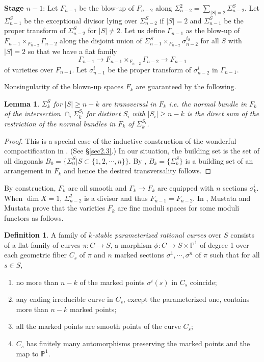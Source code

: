\documentclass[10pt]{amsart}
\newtheorem{lemma}[theorem]{Lemma}
\theoremstyle{definition}
\newtheorem{definition}[theorem]{Definition}
\newcommand{\PP}{\mathbb{P}}
\begin{document}
\bigskip
\noindent \textbf{Stage $n-1$}: Let $F_{n-1}$ be the blow-up of
$F_{n-2}$ along $\Sigma_{n-2}^2=\sum_{|S|=2}\Sigma_{n-2}^S$. Let
$\Sigma_{n-1}^S$ be the exceptional divisor lying over
$\Sigma_{n-2}^S$ if $|S|=2$ and $\Sigma_{n-1}^S$ be the proper
transform of $\Sigma_{n-2}^S$ for $|S|\ne 2$. Let us define
$\Gamma_{n-1}$ as the blow-up of
$F_{n-1}\times_{F_{n-2}}\Gamma_{n-2}$ along the disjoint union of
$\Sigma^S_{n-1}\times_{F_{n-2}}\sigma^{i_S}_{n-2}$ for all $S$
with $|S|=2$ so that we have a flat family
\[
\Gamma_{n-1}\to F_{n-1}\times_{F_{n-2}}\Gamma_{n-2} \to F_{n-1}
\]
of varieties over $F_{n-1}$. Let $\sigma_{n-1}^i$ be the proper
transform of $\sigma_{n-2}^i$ in $\Gamma_{n-1}$.

\bigskip
Nonsingularity of the blown-up spaces $F_k$ are guaranteed by the
following.

\begin{lemma}\label{lem3-1}
$\Sigma^S_{k}$ for $|S|\ge n-k$ are transversal in $F_{k}$ i.e.
the normal bundle in $F_{k}$ of  the intersection
$\cap_i\Sigma^{S_i}_k$ for distinct $S_i$ with $|S_i|\ge n-k$ is
the direct sum of  the restriction of the normal bundles in $F_k$
of $\Sigma^{S_i}_k$.
\end{lemma}
\begin{proof}
This is a special case of the inductive construction of the
wonderful compactification in \cite{Li}. (See \S \ref{sec2.3}.) In
our situation, the building set is the set of all diagonals $B_0 =
\{\Sigma_0^S | S \subset \{1, 2, \cdots, n\}\}$. By
\cite[Proposition 2.8]{Li}, $B_k=\{\Sigma_k^S\}$ is a building set
of an arrangement in $F_k$ and hence the desired transversality
follows.
\end{proof}



By construction, $F_k$ are all smooth and $\Gamma_k\to F_k$ are
equipped with $n$ sections $\sigma_k^i$. When $\dim X=1$,
$\Sigma^2_{n-2}$ is a divisor and thus $F_{n-1}=F_{n-2}$. In
\cite[Proposition 1.8]{Mustata}, Mustata and Mustata prove that
the varieties $F_k$ are fine moduli spaces for some moduli
functors as follows.

\begin{definition}\label{def3.1} \cite[Definition 1.7]{Mustata}
A family of \emph{$k$-stable parameterized rational curves} over
$S$ consists of a flat family of curves $\pi:C\to S$, a morphism
$\phi:C\to S\times \PP^1$ of degree 1 over each geometric fiber
$C_s$ of $\pi$ and $n$ marked sections $\sigma^1,\cdots, \sigma^n$
of $\pi$ such that for all $s\in S$, \begin{enumerate}
\item no more than $n-k$ of the marked points $\sigma^i(s)$ in $C_s$ coincide;
\item any ending irreducible curve in $C_s$, except the parameterized one, contains
more than $n-k$ marked points;
\item all the marked points are smooth points of the curve $C_s$;
\item $C_s$ has finitely many automorphisms preserving the marked
points and the map to $\PP^1$.
\end{enumerate}
\end{definition}
\end{document}
